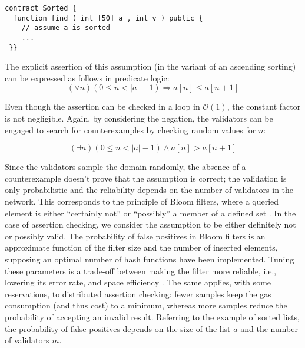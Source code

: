 \begin{lstlisting}[caption=Smart contract expecting a sorted array \cite{thiemann_2020}, numbers=none, language=Solidity, label=lst:sorted]
contract Sorted {
  function find ( int [50] a , int v ) public {
    // assume a is sorted
    ...
 }}
\end{lstlisting}

The explicit assertion of this assumption (in the variant of an ascending sorting) can be expressed as follows in predicate logic:
\begin{equation}\label{eq:sorted}
	(\forall n) (0 \leq n < |a| - 1) \Rightarrow a[n] \leq a[n+1]
\end{equation}

Even though the assertion can be checked in a loop in $\mathcal{O}(1)$, the constant factor is not negligible. Again, by considering the negation, the validators can be engaged to search for counterexamples by checking random values for $n$:
 
\begin{equation}\label{eq:sorted_neg}
	(\exists n) (0 \leq n < |a| - 1) \wedge a[n] > a[n+1]
\end{equation}

Since the validators sample the domain randomly, the absence of a counterexample doesn't prove that the assumption is correct; the validation is only probabilistic and the reliability depends on the number of validators in the network. This corresponds to the principle of Bloom filters, where a queried element is either ``certainly not'' or ``possibly'' a member of a defined set \cite{blustein_bloom_2002}. In the case of assertion checking, we consider the assumption to be either definitely not or possibly valid. The probability of false positives in Bloom filters is an approximate function of the filter size and the number of inserted elements, supposing an optimal number of hash functions have been implemented. Tuning these parameters is a trade-off between making the filter more reliable, i.e., lowering its error rate, and space efficiency \cite{blustein_bloom_2002}. The same applies, with some reservations, to distributed assertion checking: fewer samples keep the gas consumption (and thus cost) to a minimum, whereas more samples reduce the probability of accepting an invalid result. Referring to the example of sorted lists, the probability of false positives depends on the size of the list $a$ and the number of validators $m$.

